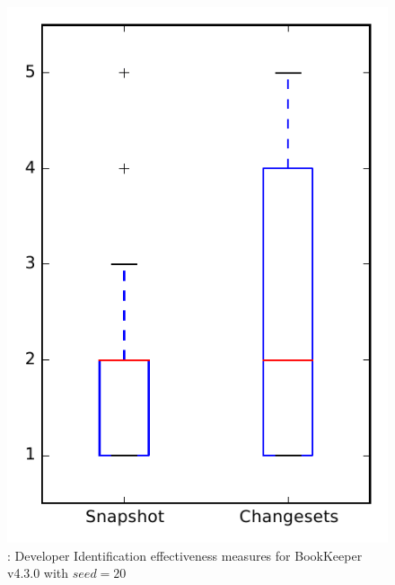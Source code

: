 
\begin{figure}
\centering
\includegraphics[height=0.4\textheight]{figures/dit_seed/rq1_bookkeeper_20}
\caption{\rtwo: Developer Identification effectiveness measures for BookKeeper v4.3.0 with $seed=20$}
\label{fig:dit_seed:rq1:bookkeeper}
\end{figure}
